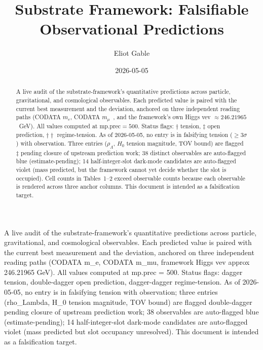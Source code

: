 \documentclass[reprint,amsmath,amssymb,aps,prd,longbibliography,floatfix]{revtex4-2}
\begin{document}
\title{Substrate Framework: Falsifiable Observational Predictions}

\author{Eliot Gable}

\date{2026-05-05}

\begin{abstract}
\noindent
A live audit of the substrate-framework's quantitative predictions
across particle, gravitational, and cosmological observables. Each
predicted value is paired with the current best measurement and the
deviation, anchored on three independent reading paths (CODATA
$m_e$, CODATA $m_\mu$~\cite{CODATA2022}, and the framework's own
Higgs vev $\approx 246.21965$~GeV). All values computed at
$\mathrm{mp.prec}=500$. Status flags: $\dagger$ tension, $\ddagger$
open prediction, $\dagger\dagger$ regime-tension. As of 2026-05-05,
no entry is in falsifying tension ($\geq 3\sigma$) with observation.
Three entries ($\rho_\Lambda$, $H_0$ tension magnitude, TOV bound)
are flagged~$\ddagger$ pending closure of upstream prediction work;
38 distinct observables are auto-flagged blue (estimate-pending);
14 half-integer-slot dark-mode candidates are auto-flagged violet
(mass predicted, but the framework cannot yet decide whether the
slot is occupied). Cell counts in Tables~1--2 exceed observable
counts because each observable is rendered across three anchor
columns. This document is intended as a falsification target.
\end{abstract}

\iffalse

A live audit of the substrate-framework's quantitative predictions across
particle, gravitational, and cosmological observables. Each predicted value
is paired with the current best measurement and the deviation, anchored on
three independent reading paths (CODATA m_e, CODATA m_mu, framework Higgs
vev approx 246.21965 GeV). All values computed at mp.prec = 500. Status
flags: dagger tension, double-dagger open prediction, dagger-dagger regime-tension.
As of 2026-05-05, no entry is in falsifying tension with observation;
three entries (rho_Lambda, H_0 tension magnitude, TOV bound) are flagged
double-dagger pending closure of upstream prediction work; 38 observables
are auto-flagged blue (estimate-pending); 14 half-integer-slot dark-mode
candidates are auto-flagged violet (mass predicted but slot occupancy
unresolved). This document is intended as a falsification target.
\end{document}
